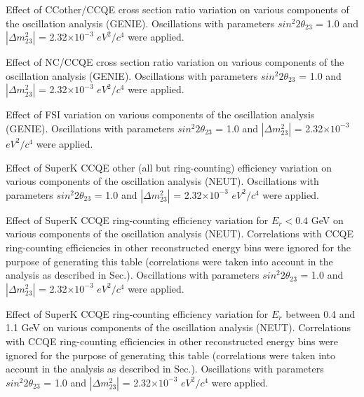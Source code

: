 %
%
%
%

\caption{ 
  Effect of CCother/CCQE cross section ratio variation
  on various components of the oscillation analysis (GENIE).
  Oscillations with parameters $sin^{2}2\theta_{23}$ = 1.0 and $|\Delta m^{2}_{23}|$ = 2.32$\times10^{-3}$ $eV^{2}/c^{4}$ were applied.  
}


%
%
%
%

\caption{ 
  Effect of NC/CCQE cross section ratio variation
  on various components of the oscillation analysis (GENIE).
  Oscillations with parameters $sin^{2}2\theta_{23}$ = 1.0 and $|\Delta m^{2}_{23}|$ = 2.32$\times10^{-3}$ $eV^{2}/c^{4}$ were applied.  
}


%
%
%
%

\caption{ 
  Effect of FSI variation
  on various components of the oscillation analysis (GENIE).
  Oscillations with parameters $sin^{2}2\theta_{23}$ = 1.0 and $|\Delta m^{2}_{23}|$ = 2.32$\times10^{-3}$ $eV^{2}/c^{4}$ were applied.  
}


\clearpage

%
%


%
%
%
%

\caption{
  Effect of SuperK CCQE other (all but ring-counting) efficiency variation 
  on various components of the oscillation analysis (NEUT).
  Oscillations with parameters $sin^{2}2\theta_{23}$ = 1.0 and $|\Delta m^{2}_{23}|$ = 2.32$\times10^{-3}$ $eV^{2}/c^{4}$ were applied.  
}


%
%
%
%

\caption{ 
  Effect of SuperK CCQE ring-counting efficiency variation for $E_{r}<0.4$ GeV  
  on various components of the oscillation analysis (NEUT).
  Correlations with CCQE ring-counting efficiencies in other reconstructed energy bins were ignored for the purpose of generating
  this table (correlations were taken into account in the analysis as described in Sec.).
  Oscillations with parameters $sin^{2}2\theta_{23}$ = 1.0 and $|\Delta m^{2}_{23}|$ = 2.32$\times10^{-3}$ $eV^{2}/c^{4}$ were applied.  
}

%
%
%
%

\caption{ 
  Effect of SuperK CCQE ring-counting efficiency variation for $E_{r}$ between 0.4 and 1.1 GeV  
  on various components of the oscillation analysis (NEUT).
  Correlations with CCQE ring-counting efficiencies in other reconstructed energy bins were ignored for the purpose of generating
  this table (correlations were taken into account in the analysis as described in Sec.).
  Oscillations with parameters $sin^{2}2\theta_{23}$ = 1.0 and $|\Delta m^{2}_{23}|$ = 2.32$\times10^{-3}$ $eV^{2}/c^{4}$ were applied.  
}

